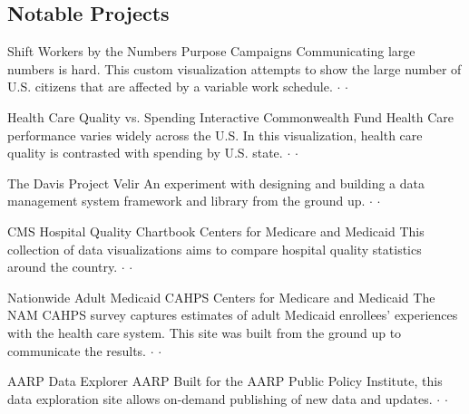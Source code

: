 \documentclass{article}
\begin{document}
\begin{paracol}{2}
  \begin{leftcolumn}

\section*{Notable Projects}

{Shift Workers by the Numbers}
{Purpose Campaigns}{%
Communicating large numbers is hard. This custom visualization attempts to show the large number of U.S. citizens that are affected by a variable work schedule.
 $\cdot$  $\cdot$ %
}

{Health Care Quality vs. Spending Interactive}
{Commonwealth Fund}{%
Health Care performance varies widely across the U.S. In this visualization, health care quality is contrasted with spending by U.S. state.
 $\cdot$  $\cdot$ %
}

{The Davis Project}
{Velir}{%
An experiment with designing and building a data management system framework and library from the ground up. 
 $\cdot$  $\cdot$ %
}

{CMS Hospital Quality Chartbook}
{Centers for Medicare and Medicaid}{%
This collection of data visualizations aims to compare hospital quality statistics around the country.
 $\cdot$  $\cdot$ %
}

{Nationwide Adult Medicaid CAHPS}
{Centers for Medicare and Medicaid}{%
The NAM CAHPS survey captures estimates of adult Medicaid enrollees’ experiences with the health care system. This site was built from the ground up to communicate the results.
 $\cdot$  $\cdot$ %
}

{AARP Data Explorer}
{AARP}{%
Built for the AARP Public Policy Institute, this data exploration site allows on-demand publishing of new data and updates.
 $\cdot$  $\cdot$ %
}


\end{leftcolumn}
\end{paracol}
\end{document}

